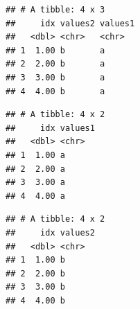 \documentclass[krantz2,ChapterTOCs]{krantz}\usepackage{knitr}
\begin{document}
\begin{knitrout}\footnotesize
{}\color{fgcolor}\begin{kframe}
\begin{alltt}
\end{alltt}


{\ttfamily\noindent\itshape{}}\begin{verbatim}
## # A tibble: 4 x 3
##     idx values2 values1
##   <dbl> <chr>   <chr>  
## 1  1.00 b       a      
## 2  2.00 b       a      
## 3  3.00 b       a      
## 4  4.00 b       a
\end{verbatim}
\end{kframe}
\end{knitrout}

\begin{knitrout}\footnotesize
{}\color{fgcolor}\begin{kframe}
\begin{alltt}
\end{alltt}


{\ttfamily\noindent\itshape{}}\begin{verbatim}
## # A tibble: 4 x 2
##     idx values1
##   <dbl> <chr>  
## 1  1.00 a      
## 2  2.00 a      
## 3  3.00 a      
## 4  4.00 a
\end{verbatim}
\end{kframe}
\end{knitrout}

\begin{knitrout}\footnotesize
{}\color{fgcolor}\begin{kframe}
\begin{alltt}
\end{alltt}


{\ttfamily\noindent\itshape{}}\begin{verbatim}
## # A tibble: 4 x 2
##     idx values2
##   <dbl> <chr>  
## 1  1.00 b      
## 2  2.00 b      
## 3  3.00 b      
## 4  4.00 b
\end{verbatim}
\end{kframe}
\end{knitrout}
\end{document}
